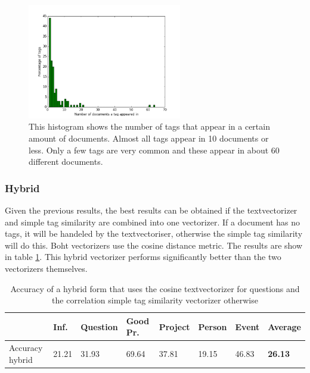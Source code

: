 \begin{figure}
\center
\includegraphics[width =0.6\textwidth]{images/weightedtagexplanation}
\caption{This histogram shows the number of tags that appear in a certain amount of documents. Almost all tags appear in 10 documents or less. Only a few tags are very common and these appear in about 60 different documents.}
\label{weightedtag}
\end{figure}

\subsubsection{Hybrid}
Given the previous results, the best results can be obtained if the textvectorizer and simple tag similarity are combined into one vectorizer. If a document has no tags, it will be handeled by the textvectoriser, otherwise the simple tag similarity will do this. Boht vectorizers use the cosine distance metric. The results are show in table \ref{hybrid}. This hybrid vectorizer performs significantly better than the two vectorizers themselves. 


\begin{table}[h!]
\begin{tabular}{| l | l | l | l | l | l | l | l |}
\hline
 & Inf. &  Question &  Good Pr.& Project & Person &  Event & {\bf Average} \\
\hline
Accuracy hybrid & 21.21 & 31.93 & 69.64 & 37.81 & 19.15 & 46.83 & {\bf 26.13}\\
\hline
\end{tabular}
\caption{Accuracy of a hybrid form that uses the cosine textvectorizer for questions and the correlation simple tag similarity vectorizer otherwise}
\label{hybrid}
\end{table}

